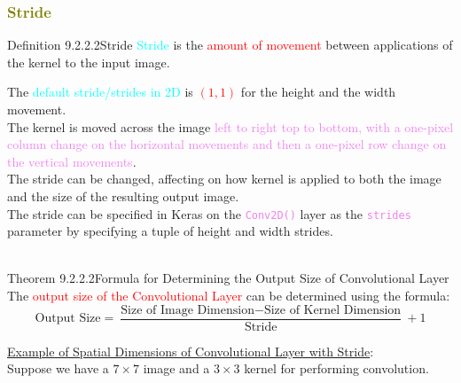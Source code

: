 \documentclass{book}
\begin{document}
\textcolor{olive}{\subsubsection{Stride}}
\begin{defBox}{Definition 9.2.2.2}{Stride}
    \textcolor{cyan}{Stride} is the \textcolor{red}{amount of movement} between applications of the kernel to the input image.
\end{defBox}
The \textcolor{cyan}{default stride/strides in 2D} is \textcolor{red}{$(1,1)$} for the height and the width movement.\\
The kernel is moved across the image \textcolor{violet}{left to right top to bottom, with a one-pixel column change on the horizontal movements and then a one-pixel row change on the vertical movements}.\\
The stride can be changed, affecting on how kernel is applied to both the image and the size of the resulting output image.\\
The stride can be specified in Keras on the \textcolor{violet}{\texttt{Conv2D()}} layer as the \textcolor{violet}{\texttt{strides}} parameter by specifying a tuple of height and width strides.\\
\\
\vspace{1mm}
\begin{thmBox}{Theorem 9.2.2.2}{Formula for Determining the Output Size of Convolutional Layer}
    The \textcolor{red}{output size of the Convolutional Layer} can be determined using the formula:
    \[
        \text{Output Size} = \frac{\text{Size of Image Dimension} - \text{Size of Kernel Dimension}}{\text{Stride}} + 1
    \]
\end{thmBox}
\uline{Example of Spatial Dimensions of Convolutional Layer with Stride}:\\
Suppose we have a $7 \times 7$ image and a $3 \times 3$ kernel for performing convolution.\\
\end{document}

